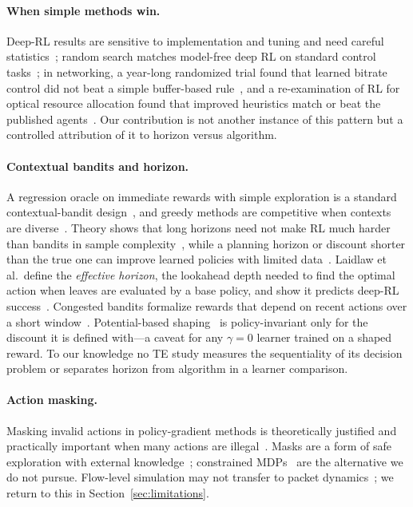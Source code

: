 \paragraph{When simple methods win.}
Deep-RL results are sensitive to implementation and tuning and need careful
statistics~\citep{henderson2018matters,engstrom2020implementation,andrychowicz2021matters,agarwal2021precipice,patterson2024empirical};
random search matches model-free deep RL on standard control
tasks~\citep{mania2018random}; in networking, a year-long randomized trial found
that learned bitrate control did not beat a simple buffer-based
rule~\citep{yan2020puffer}, and a re-examination of RL for optical resource
allocation found that improved heuristics match or beat the published
agents~\citep{doherty2025hype}. Our contribution is not another instance of
this pattern but a controlled attribution of it to horizon versus algorithm.

\paragraph{Contextual bandits and horizon.}
A regression oracle on immediate rewards with simple exploration is a standard
contextual-bandit design~\citep{langford2007epoch,foster2020beyond}, and greedy
methods are competitive when contexts are diverse~\citep{bietti2021bakeoff}.
Theory shows that long horizons need not make RL much harder than bandits in
sample complexity~\citep{zhang2021rlbandits}, while a planning horizon or
discount shorter than the true one can improve learned policies with limited
data~\citep{jiang2015horizon,petrik2008biasing,amit2020discount}. Laidlaw et
al.\ define the \emph{effective horizon}, the lookahead depth needed to find the
optimal action when leaves are evaluated by a base policy, and show it predicts
deep-RL success~\citep{laidlaw2023effective,laidlaw2024stochastic}. Congested
bandits formalize rewards that depend on recent actions over a short
window~\citep{awasthi2022congested}. Potential-based
shaping~\citep{ng1999shaping} is policy-invariant only for the discount it is
defined with---a caveat for any $\gamma=0$ learner trained on a shaped reward.
To our knowledge no TE study measures the sequentiality of its decision problem
or separates horizon from algorithm in a learner comparison.

\paragraph{Action masking.}
Masking invalid actions in policy-gradient methods is theoretically justified
and practically important when many actions are illegal~\citep{huang2022masking}.
Masks are a form of safe exploration with external knowledge~\citep{garcia2015safe};
constrained MDPs~\citep{altman1999cmdp,achiam2017cpo} are the alternative we do
not pursue. Flow-level simulation may not transfer to packet
dynamics~\citep{boltres2024packerl}; we return to this in
Section~\ref{sec:limitations}.
